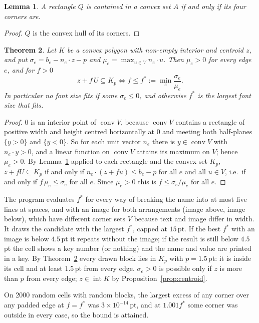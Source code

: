 \documentclass[11pt,a4paper]{article}
\theoremstyle{plain}
\newtheorem{theorem}{Theorem}
\newtheorem{lemma}[theorem]{Lemma}
\theoremstyle{definition}
\theoremstyle{remark}
\newcommand{\interior}{\operatorname{int}}
\newcommand{\conv}{\operatorname{conv}}
\begin{document}
\begin{lemma}\label{lem:rect}
A rectangle $Q$ is contained in a convex set $A$ if and only if its four
corners are.
\end{lemma}
\begin{proof}
$Q$ is the convex hull of its corners.
\end{proof}

\begin{theorem}\label{thm:label}
Let $K$ be a convex polygon with non-empty interior and centroid $z$, and put
$\sigma_e=b_e-n_e\cdot z-p$ and $\mu_e=\max_{u\in V}n_e\cdot u$. Then
$\mu_e>0$ for every edge $e$, and for $f>0$
\[
  z+f\,U\subseteq K_p
  \iff
  f\le f^\ast:=\min_e\frac{\sigma_e}{\mu_e}.
\]
In particular no font size fits if some $\sigma_e\le 0$, and otherwise $f^\ast$
is the largest font size that fits.
\end{theorem}
\begin{proof}
$0$ is an interior point of $\conv V$, because $\conv V$ contains a rectangle
of positive width and height centred horizontally at $0$ and meeting both
half-planes $\{y>0\}$ and $\{y<0\}$. So for each unit vector $n_e$ there is
$y\in\conv V$ with $n_e\cdot y>0$, and a linear function on $\conv V$ attains
its maximum on $V$; hence $\mu_e>0$. By Lemma~\ref{lem:rect} applied to each
rectangle and the convex set $K_p$, $z+fU\subseteq K_p$ if and only if
$n_e\cdot(z+fu)\le b_e-p$ for all $e$ and all $u\in V$, i.e.\ if and only if
$f\,\mu_e\le\sigma_e$ for all $e$. Since $\mu_e>0$ this is $f\le\sigma_e/\mu_e$
for all $e$.
\end{proof}

The program evaluates $f^\ast$ for every way of breaking the name into at most
five lines at spaces, and with an image for both arrangements (image above,
image below), which have different corner sets $V$ because text and image
differ in width. It draws the candidate with the largest $f^\ast$, capped at
$15$\,pt. If the best $f^\ast$ with an image is below $4.5$\,pt it repeats
without the image; if the result is still below $4.5$\,pt the cell shows a key
number (or nothing) and the name and value are printed in a key. By
Theorem~\ref{thm:label} every drawn block lies in $K_p$ with $p=1.5$\,pt: it
is inside its cell and at least $1.5$\,pt from every edge. $\sigma_e>0$ is
possible only if $z$ is more than $p$ from every edge; $z\in\interior K$ by
Proposition~\ref{prop:centroid}.

On 2000 random cells with random blocks, the largest excess of any corner
over any padded edge at $f=f^\ast$ was $3\times10^{-14}$\,pt, and at
$1.001f^\ast$ some corner was outside in every case, so the bound is attained.
\end{document}
